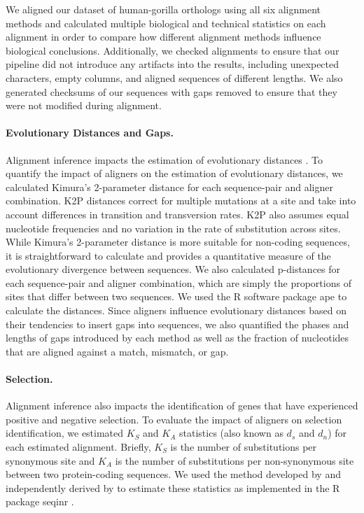 \documentclass[12pt,letterpaper]{article}
\begin{document}
We aligned our dataset of human-gorilla orthologs using all six alignment methods and calculated multiple biological and technical statistics on each alignment in order to compare how different alignment methods influence biological conclusions.
%
Additionally, we checked alignments to ensure that our pipeline did not introduce any artifacts into the results, including unexpected characters, empty columns, and aligned sequences of different lengths. We also generated checksums of our sequences with gaps removed to ensure that they were not modified during alignment.

\paragraph{Evolutionary Distances and Gaps.}

Alignment inference impacts the estimation of evolutionary distances \citep{redelings2007incorporating}. To quantify the impact of aligners on the estimation of evolutionary distances, we calculated Kimura's 2-parameter distance \citep[K2P;][]{kimura1980simple} for each sequence-pair and aligner combination.  K2P distances correct for multiple mutations at a site and take into account differences in transition and transversion rates. K2P also assumes equal nucleotide frequencies and no variation in the rate of substitution across sites. While Kimura's 2-parameter distance is more suitable for non-coding sequences, it is straightforward to calculate and provides a quantitative measure of the evolutionary divergence between sequences. We also calculated p-distances \citep{saitou1987neighbor} for each sequence-pair and aligner combination, which are simply the proportions of sites that differ between two sequences. We used the R \citep{r2024} software package ape \citep{paradis2019ape} to calculate the distances.
%
Since aligners influence evolutionary distances based on their tendencies to insert gaps into sequences, we also quantified the phases and lengths of gaps introduced by each method as well as the fraction of nucleotides that are aligned against a match, mismatch, or gap.

\paragraph{Selection.}
Alignment inference also impacts the identification of genes that have experienced positive and negative selection. To evaluate the impact of aligners on selection identification, we estimated $K_S$ and $K_A$ statistics (also known as $d_s$ and $d_n$) for each estimated alignment. Briefly, $K_S$ is the number of substitutions per synonymous site and $K_A$ is the number of substitutions per non-synonymous site between two protein-coding sequences. We used the method developed by \cite{ka_ks_li_1993} and independently derived by \cite{Pamilo1993} to estimate these statistics as implemented in the R package seqinr \citep{seqinr}. 
\end{document}
